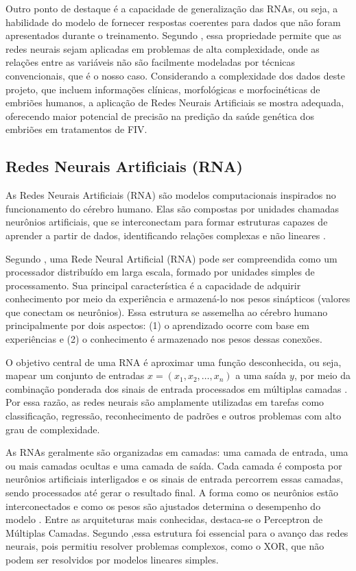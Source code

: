 Outro ponto de destaque é a capacidade de generalização das RNAs, ou seja, a habilidade do modelo de fornecer respostas coerentes para dados que não foram apresentados durante o treinamento. Segundo , essa propriedade permite que as redes neurais sejam aplicadas em problemas de alta complexidade, onde as relações entre as variáveis não são facilmente modeladas por técnicas convencionais, que é o nosso caso. Considerando a complexidade dos dados deste projeto, que incluem informações clínicas, morfológicas e morfocinéticas de embriões humanos, a aplicação de Redes Neurais Artificiais se mostra adequada, oferecendo maior potencial de precisão na predição da saúde genética dos embriões em tratamentos de FIV.

\subsection{Redes Neurais Artificiais (RNA)}

As Redes Neurais Artificiais (RNA) são modelos computacionais inspirados no funcionamento do cérebro humano.  Elas são compostas por unidades chamadas neurônios artificiais, que se interconectam para formar estruturas capazes de aprender a partir de dados, identificando relações complexas e não lineares \cite{haykin2009}.

Segundo , uma Rede Neural Artificial (RNA) pode ser compreendida como um processador distribuído em larga escala, formado por unidades simples de processamento. Sua principal característica é a capacidade de adquirir conhecimento por meio da experiência e armazená-lo nos pesos sinápticos (valores que conectam os neurônios). Essa estrutura se assemelha ao cérebro humano principalmente por dois aspectos: (1) o aprendizado ocorre com base em experiências e (2) o conhecimento é armazenado nos pesos dessas conexões.

O objetivo central de uma RNA é aproximar uma função desconhecida, ou seja, mapear um conjunto de entradas $x = (x_1, x_2, \ldots, x_n)$ a uma saída $y$, por meio da combinação ponderada dos sinais de entrada processados em múltiplas camadas \cite{haykin2009}. Por essa razão, as redes neurais são amplamente utilizadas em tarefas como classificação, regressão, reconhecimento de padrões e outros problemas com alto grau de complexidade.

As RNAs geralmente são organizadas em camadas: uma camada de entrada, uma ou mais camadas ocultas e uma camada de saída. Cada camada é composta por neurônios artificiais interligados e os sinais de entrada percorrem essas camadas, sendo processados até gerar o resultado final. A forma como os neurônios estão interconectados e como os pesos são ajustados determina o desempenho do modelo \cite{haykin2009}. Entre as arquiteturas mais conhecidas, destaca-se o Perceptron de Múltiplas Camadas. Segundo ,essa estrutura foi essencial para o avanço das redes neurais, pois permitiu resolver problemas complexos, como o XOR, que não podem ser resolvidos por modelos lineares simples.

